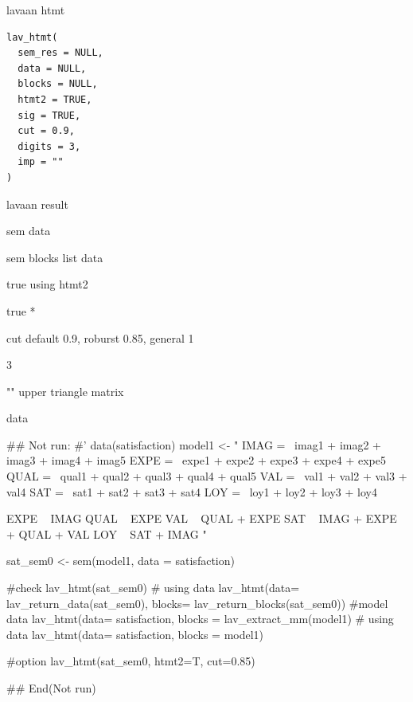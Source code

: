 \documentclass[a4paper]{book}
\begin{document}
%
\begin{Description}
lavaan htmt
\end{Description}
%
\begin{Usage}
\begin{verbatim}
lav_htmt(
  sem_res = NULL,
  data = NULL,
  blocks = NULL,
  htmt2 = TRUE,
  sig = TRUE,
  cut = 0.9,
  digits = 3,
  imp = ""
)
\end{verbatim}
\end{Usage}
%
\begin{Arguments}
\begin{ldescription}
\item[\code{sem\_res}] lavaan result

\item[\code{data}] sem data

\item[\code{blocks}] sem blocks list data

\item[\code{htmt2}] true using htmt2

\item[\code{sig}] true *

\item[\code{cut}] cut default 0.9, roburst 0.85, general 1

\item[\code{digits}] 3

\item[\code{imp}] "" upper triangle matrix
\end{ldescription}
\end{Arguments}
%
\begin{Value}
data
\end{Value}
%
\begin{Examples}
\begin{ExampleCode}

\#\# Not run: 
#'
data(satisfaction)
model1 <- "
IMAG =~ imag1 + imag2 + imag3 + imag4 + imag5
EXPE =~ expe1 + expe2 + expe3 + expe4 + expe5
QUAL =~ qual1 + qual2 + qual3 + qual4 + qual5
VAL =~ val1 + val2 + val3 + val4
SAT =~ sat1 + sat2 + sat3 + sat4
LOY =~ loy1 + loy2 + loy3 + loy4

EXPE ~ IMAG
QUAL ~ EXPE
VAL ~  QUAL + EXPE
SAT ~ IMAG + EXPE + QUAL + VAL
LOY ~ SAT + IMAG
"

sat_sem0 <- sem(model1, data = satisfaction)

#check
lav_htmt(sat_sem0)
# using data
lav_htmt(data= lav_return_data(sat_sem0), blocks= lav_return_blocks(sat_sem0))
#model data
lav_htmt(data= satisfaction, blocks =  lav_extract_mm(model1)%
# using data
lav_htmt(data= satisfaction, blocks = model1)

#option
lav_htmt(sat_sem0, htmt2=T, cut=0.85)



## End(Not run)

\end{ExampleCode}
\end{Examples}
\end{document}
